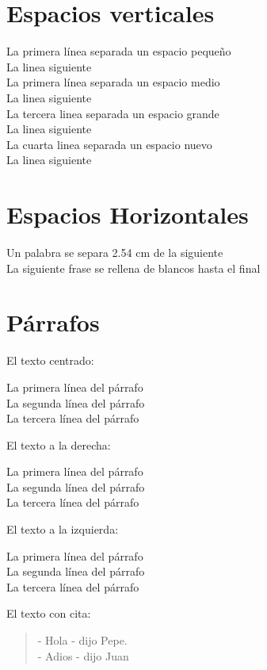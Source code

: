 \documentclass[10pt,a4paper]{article}
\begin{document}
\section{Espacios verticales}
La primera línea separada un espacio pequeño 
\smallskip \\
La linea siguiente \\
La primera línea separada un espacio medio 
\medskip \\
La linea siguiente \\
La tercera linea separada un espacio grande 
\bigskip \\
La linea siguiente \\
La cuarta linea separada un espacio nuevo 
\vspace{8cm} \\
La linea siguiente 

\section{Espacios Horizontales}
Un palabra se separa 2.54 cm 
\hspace{2.54cm} de la siguiente \\
La siguiente frase se 
\hfill{rellena de blancos hasta el final} 

\newpage
\section{Párrafos}
El texto centrado: 
\begin{center}
  La primera línea del párrafo 
  \vspace{2cm} \\ 
  La segunda línea del párrafo 
  \vspace{-0.7cm} \\
  La tercera línea del párrafo \\
\end{center}
El texto a la derecha:
\begin{flushright}
  La primera línea del párrafo \\
  La segunda línea del párrafo \\
  La tercera línea del párrafo \\
\end{flushright}
El texto a la izquierda:
\begin{flushleft}
  La primera línea del párrafo \\
  La segunda línea del párrafo \\
  La tercera línea del párrafo \\
\end{flushleft}
El texto con cita:
\begin{quote}
  - Hola - dijo Pepe. \\
  - Adios - dijo Juan \\
\end{quote}
\end{document}
